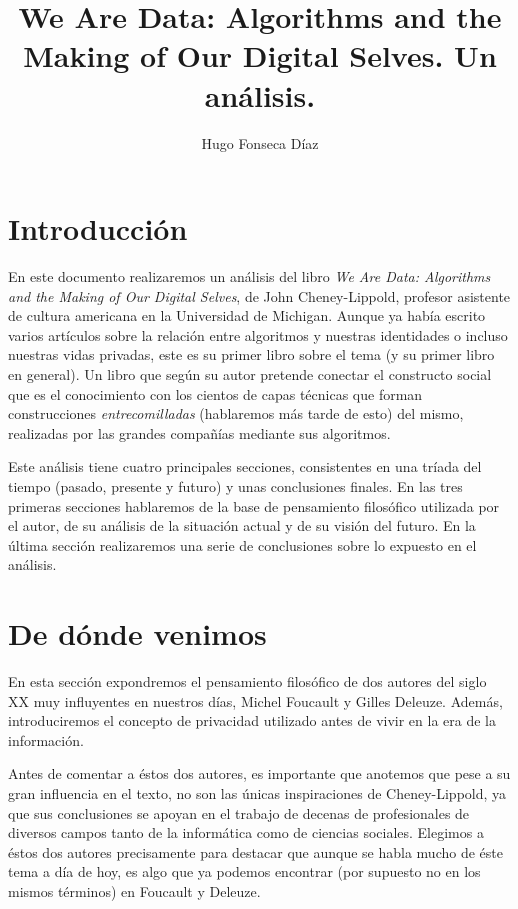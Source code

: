 \documentclass[11pt]{article}
\begin{document}
\title{We Are Data: Algorithms and the Making of Our Digital Selves. Un análisis.}
\author{Hugo Fonseca Díaz\\ }
\maketitle
\section{Introducción}
En este documento realizaremos un análisis del libro \textit{We Are Data: Algorithms and the Making of Our Digital Selves}, de John Cheney-Lippold, profesor asistente de cultura americana en la Universidad de Michigan. Aunque ya había escrito varios artículos sobre la relación entre algoritmos y nuestras identidades o incluso nuestras vidas privadas, este es su primer libro sobre el tema (y su primer libro en general). Un libro que según su autor pretende conectar el constructo social que es el conocimiento con los cientos de capas técnicas que forman construcciones \textit{entrecomilladas} (hablaremos más tarde de esto) del mismo, realizadas por las grandes compañías mediante sus algoritmos.

Este análisis tiene cuatro principales secciones, consistentes en una tríada del tiempo (pasado, presente y futuro) y unas conclusiones finales. En las tres primeras secciones hablaremos de la base de pensamiento filosófico utilizada por el autor, de su análisis de la situación actual y de su visión del futuro. En la última sección realizaremos una serie de conclusiones sobre lo expuesto en el análisis.
\section{De dónde venimos}
En esta sección expondremos el pensamiento filosófico de dos autores del siglo XX muy influyentes en nuestros días, Michel Foucault y Gilles Deleuze. Además, introduciremos el concepto de privacidad utilizado antes de vivir en la era de la información.

Antes de comentar a éstos dos autores, es importante que anotemos que pese a su gran influencia en el texto, no son las únicas inspiraciones de Cheney-Lippold, ya que sus conclusiones se apoyan en el trabajo de decenas de profesionales de diversos campos tanto de la informática como de ciencias sociales. Elegimos a éstos dos autores precisamente para destacar que aunque se habla mucho de éste tema a día de hoy, es algo que ya podemos encontrar (por supuesto no en los mismos términos) en Foucault y Deleuze. 
\end{document}
